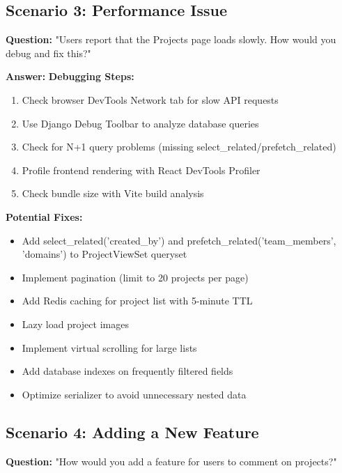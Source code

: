 \documentclass[11pt,a4paper]{article}
\begin{document}
\subsection{Scenario 3: Performance Issue}
\textbf{Question:} "Users report that the Projects page loads slowly. How would you debug and fix this?"

\textbf{Answer:}
\textbf{Debugging Steps:}
\begin{enumerate}[leftmargin=*]
    \item Check browser DevTools Network tab for slow API requests
    \item Use Django Debug Toolbar to analyze database queries
    \item Check for N+1 query problems (missing select\_related/prefetch\_related)
    \item Profile frontend rendering with React DevTools Profiler
    \item Check bundle size with Vite build analysis
\end{enumerate}

\textbf{Potential Fixes:}
\begin{itemize}[leftmargin=*]
    \item Add select\_related('created\_by') and prefetch\_related('team\_members', 'domains') to ProjectViewSet queryset
    \item Implement pagination (limit to 20 projects per page)
    \item Add Redis caching for project list with 5-minute TTL
    \item Lazy load project images
    \item Implement virtual scrolling for large lists
    \item Add database indexes on frequently filtered fields
    \item Optimize serializer to avoid unnecessary nested data
\end{itemize}

\subsection{Scenario 4: Adding a New Feature}
\textbf{Question:} "How would you add a feature for users to comment on projects?"
\end{document}

